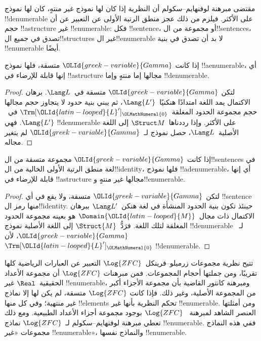 \documentclass[../../../include/open-logic-section]{subfiles}
\begin{document}

مقتضى مبرهنة لوفنهايم--سكولم أن النظرية إذا كان لها نموذج غير منتهٍ،
كان لها نموذج !!{denumerable} على الأكثر. فيلزم من ذلك عجز منطق
الرتبة الأولى عن التعبير عن أن حجم !!a{structure} غير
!!{enumerable}: فكل !!{sentence}، أو مجموعة من ال!!{sentence}s،
تصدق في جميع ال!!{structure}s غير ال!!{enumerable} لا بد أن
تصدق في بنية !!{enumerable} أيضًا.

\begin{thm}
 إذا كانت ${\OLId{greek-variable}{Gamma}}$ متسقة، فلها نموذج
!!a{enumerable}، أي إنها قابلة للإرضاء في !!a{structure} مجالها إما
منتهٍ وإما !!{denumerable}.
\end{thm}

\begin{proof}
لتكن ${\OLId{greek-variable}{Gamma}}$ متسقة في~$\Lang L$. برهان الاكتمال يمد اللغة
امتدادًا هنكنيًا~$\Lang{L'}$، ثم يبني بنية حدود لا يتجاوز حجم
مجالها حجم مجموعة الحدود المغلقة~$\Trm[{\OLId{latin-looped}{L}}']_{\OLMathNumeral{0}}$ في~$\Lang{L'}$.
فهي !!{denumerable} على الأكثر. وإذا رددناها~$\Struct M$ إلى
اللغة الأصلية~$\Lang L$، حصل نموذج لـ~${\OLId{greek-variable}{Gamma}}$ لم يتغير مجاله.
\end{proof}

\begin{thm}
 إذا كانت ${\OLId{greek-variable}{Gamma}}$ مجموعة متسقة من ال!!{sentence}s
في لغة منطق الرتبة الأولى الخالية من ال!!{identity}، فلها نموذج
!!a{denumerable}، أي إنها قابلة للإرضاء في !!a{structure} مجالها غير
منتهٍ و!!{enumerable}.
\end{thm}

\begin{proof}
لتكن ${\OLId{greek-variable}{Gamma}}$ متسقة، ولا يقع في أي !!{sentence} منها رمز
ال!!{identity}. حينئذ تكون بنية الحدود المنشأة في لغة
هنكن~$\Lang L'$ ببرهان الاكتمال ذات مجال~$\Domain{{\OLId{latin-looped}{M}}}$ هو بعينه
مجموعة الحدود المغلقة لتلك اللغة. فرَدُّ~$\Struct{M}$ إلى اللغة
الأصلية نموذج !!{denumerable} لـ~${\OLId{greek-variable}{Gamma}}$، لأن
$\Trm[{\OLId{latin-looped}{L}}']_{\OLMathNumeral{0}}$ !!{denumerable}.
\end{proof}

\begin{ex}
تتيح نظرية مجموعات زرميلو--فرينكل~$\Log{ZFC}$ التعبير عن العبارات
الرياضية كلها تقريبًا، ومن جملتها أحجام المجموعات. فمن مبرهنات
$\Log{ZFC}$ أن مجموعة الأعداد الحقيقية~$\Real$ غير
!!{enumerable}، ومبرهنة كانتور القاضية بأن مجموعة الأجزاء أكبر من
المجموعة الأصلية، وغير ذلك. فإذا كانت $\Log{ZFC}$ متسقة، لم يكن
لها إلا نماذج غير منتهية؛ وفي كل منها !!{element}s تحكم النظرية
بأنها غير !!{enumerable}. ومن أمثلتها العنصر الشاهد لمبرهنة
~$\Log{ZFC}$ بوجود مجموعة أجزاء الأعداد الطبيعية. ومع ذلك تعطي
مبرهنة لوفنهايم--سكولم لـ~$\Log{ZFC}$ نماذج !!{enumerable}.
ففي هذه النماذج مجموعات «غير !!{enumerable}»، والنماذج نفسها
!!{enumerable}.
\end{ex}
\end{document}

